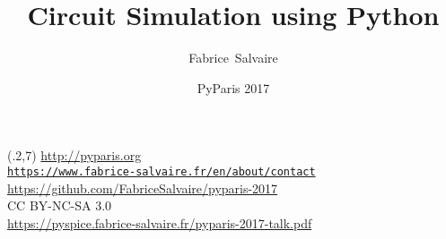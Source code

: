 





\title[]{Circuit Simulation using Python}
\author[F.~Salvaire]{Fabrice~Salvaire}
\date[13 June 17]{PyParis 2017}





%
%

\begin{frame} %
  \titlepage
  \begin{textblock}{12}(.2,7)
    \fontsize{5pt}{5pt}\selectfont
    \url{http://pyparis.org} \\[.5em]
    \texttt{\url{https://www.fabrice-salvaire.fr/en/about/contact}} \\ %
    \url{https://github.com/FabriceSalvaire/pyparis-2017} \\[.5em]
    CC BY-NC-SA 3.0 \\[2em]
    \fontsize{7pt}{7pt}\selectfont
    \url{https://pyspice.fabrice-salvaire.fr/pyparis-2017-talk.pdf}
\end{textblock}
\end{frame}

\logo{} %

%
%

